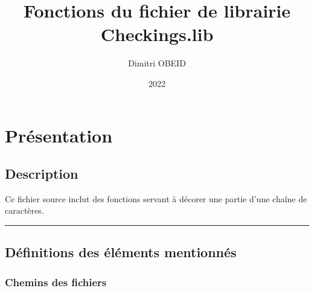 \documentclass[a4paper,10pt]{article}
\title{\color{sec1}Fonctions du fichier de librairie \color{path}Checkings.lib}\color{text}
\author{Dimitri OBEID}
\date{2022}
\begin{document}
    \maketitle
    \newpage

    \hypertarget{contents}{}
    \tableofcontents
    \newpage

    \color{sec1}
    \section{Présentation}\color{text}

    \color{sec2}
    \subsection{Description}\color{text}

    \begin{justify}
        Ce fichier source inclut des fonctions servant à décorer une partie d'une chaîne de caractères.
    \end{justify}




    \color{sec2}\par\noindent\rule{\textwidth}{0.4pt}\color{text}

    \color{sec2}
    \subsection{Définitions des éléments mentionnés}\color{text}

    \color{sec3}
    \subsubsection{Chemins des fichiers}\color{text}
\end{document}
